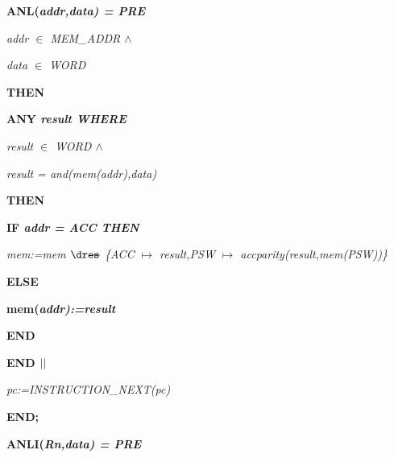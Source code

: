 \begin{sloppypar}
\hspace*{0.10in}

\hspace*{0.10in}

\hspace*{0.10in}  

\hspace*{0.10in}\bf ANL\rm (\it addr\rm ,\it data\rm ) \rm = \bf PRE

\hspace*{0.20in}\it addr $\in$  \it MEM\_ADDR  $\land$ 

\hspace*{0.20in}\it data $\in$  \it WORD

\hspace*{0.10in}\bf THEN

\hspace*{0.20in}\bf ANY \it result \bf WHERE

\hspace*{0.30in}\it result $\in$  \it WORD  $\land$ 

\hspace*{0.30in}\it result \rm = \it and\rm (\it mem\rm (\it addr\rm )\rm ,\it data\rm )

\hspace*{0.20in}\bf THEN

\hspace*{0.30in}\bf IF \it addr \rm = \it ACC \bf THEN

\hspace*{0.40in}\it mem\rm :=\it mem $\lover$ \rm \{\it ACC $\mapsto$ \it result\rm ,\it PSW $\mapsto$ \it accparity\rm (\it result\rm ,\it mem\rm (\it PSW\rm )\rm )\rm \}

\hspace*{0.30in}\bf ELSE

\hspace*{0.40in}\bf mem\rm (\it addr\rm )\rm :=\it result

\hspace*{0.30in}\bf END

\hspace*{0.20in}\bf END  $\mbox{$\mid\mid$}$ 

\hspace*{0.20in}\it pc\rm :=\it INSTRUCTION\_NEXT\rm (\it pc\rm )

\hspace*{0.10in}\bf END\rm ;

\hspace*{0.10in}\bf ANLI\rm (\it Rn\rm ,\it data\rm ) \rm = \bf PRE


\end{sloppypar}
